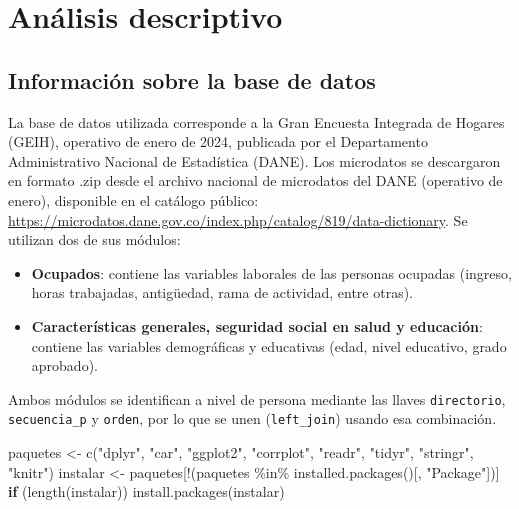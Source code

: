 \documentclass[
  spanish,
  letterpaper,
  DIV=11,
  numbers=noendperiod]{scrartcl}
\newenvironment{Shaded}{\begin{snugshade}}{\end{snugshade}}
\newcommand{\ControlFlowTok}[1]{\textcolor[rgb]{0.00,0.23,0.31}{\textbf{#1}}}
\newcommand{\FunctionTok}[1]{\textcolor[rgb]{0.28,0.35,0.67}{#1}}
\newcommand{\NormalTok}[1]{\textcolor[rgb]{0.00,0.23,0.31}{#1}}
\newcommand{\OtherTok}[1]{\textcolor[rgb]{0.00,0.23,0.31}{#1}}
\newcommand{\SpecialCharTok}[1]{\textcolor[rgb]{0.37,0.37,0.37}{#1}}
\newcommand{\StringTok}[1]{\textcolor[rgb]{0.13,0.47,0.30}{#1}}
\providecommand{\tightlist}{%
  \setlength{\itemsep}{0pt}\setlength{\parskip}{0pt}}
\begin{document}
\section{Análisis descriptivo}\label{anuxe1lisis-descriptivo}

\subsection{Información sobre la base de
datos}\label{informaciuxf3n-sobre-la-base-de-datos}

La base de datos utilizada corresponde a la Gran Encuesta Integrada de
Hogares (GEIH), operativo de enero de 2024, publicada por el
Departamento Administrativo Nacional de Estadística (DANE). Los
microdatos se descargaron en formato .zip desde el archivo nacional de
microdatos del DANE (operativo de enero), disponible en el catálogo
público:
\url{https://microdatos.dane.gov.co/index.php/catalog/819/data-dictionary}.
Se utilizan dos de sus módulos:

\begin{itemize}
\tightlist
\item
  \textbf{Ocupados}: contiene las variables laborales de las personas
  ocupadas (ingreso, horas trabajadas, antigüedad, rama de actividad,
  entre otras).
\item
  \textbf{Características generales, seguridad social en salud y
  educación}: contiene las variables demográficas y educativas (edad,
  nivel educativo, grado aprobado).
\end{itemize}

Ambos módulos se identifican a nivel de persona mediante las llaves
\texttt{directorio}, \texttt{secuencia\_p} y \texttt{orden}, por lo que
se unen (\texttt{left\_join}) usando esa combinación.

\begin{Shaded}
\begin{Highlighting}[]
\NormalTok{paquetes }\OtherTok{\textless{}{-}} \FunctionTok{c}\NormalTok{(}\StringTok{"dplyr"}\NormalTok{, }\StringTok{"car"}\NormalTok{, }\StringTok{"ggplot2"}\NormalTok{, }\StringTok{"corrplot"}\NormalTok{, }\StringTok{"readr"}\NormalTok{, }\StringTok{"tidyr"}\NormalTok{, }\StringTok{"stringr"}\NormalTok{, }\StringTok{"knitr"}\NormalTok{)}
\NormalTok{instalar }\OtherTok{\textless{}{-}}\NormalTok{ paquetes[}\SpecialCharTok{!}\NormalTok{(paquetes }\SpecialCharTok{\%in\%} \FunctionTok{installed.packages}\NormalTok{()[, }\StringTok{"Package"}\NormalTok{])]}
\ControlFlowTok{if}\NormalTok{ (}\FunctionTok{length}\NormalTok{(instalar)) }\FunctionTok{install.packages}\NormalTok{(instalar)}
\end{Highlighting}
\end{Shaded}
\end{document}
